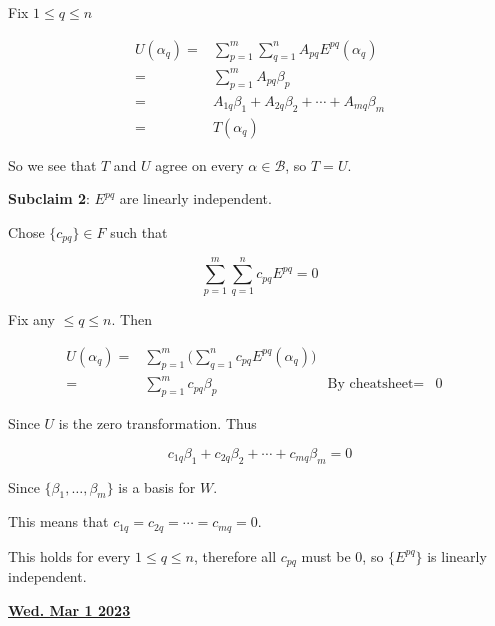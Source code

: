 \documentclass[12pt]{article}
\renewcommand{\date}[1]{\underline{\bf #1}}
\def\B{\mathcal B}
\begin{document}
{    Fix $1 \le q \le n$

    \begin{align*}
      U(\alpha_q) =&\sum_{p = 1}^m \sum_{q = 1}^n A_{pq} E^{pq}(\alpha_q) \\
                  =&\sum_{p = 1}^m  A_{pq} \beta_p \\
                  =&A_{1q} \beta_1 + A_{2q} \beta_2 + \cdots + A_{mq} \beta_m  \\
                  =&T(\alpha_q)
    \end{align*}

    So we see that $T$ and $U$ agree on every $\alpha \in \B$, so $T = U$.


    {\bf Subclaim 2}: $E^{pq}$ are linearly independent.

    Chose $\{c_{pq}\} \in F$ such that

    \[
      \sum_{p = 1}^m \sum_{q = 1}^n c_{pq} E^{pq} = 0
    \]


    Fix any $\le q \le n$. Then

    \begin{align*}
      U(\alpha_q) =&\sum_{p = 1}^{m} \Big( \sum_{q = 1}^{n} c_{pq} E^{pq} (\alpha_q) \Big) & \\
      =&\sum_{p = 1}^{m} c_{pq} \beta_p & \text{By cheatsheet}
      =&0 &
    \end{align*}

    Since $U$ is the zero transformation. Thus

    \[
      c_{1q} \beta_1 + c_{2q} \beta_2 + \cdots + c_{mq} \beta_m = 0
    \]

    Since $\{\beta_1, \dots, \beta_m\}$ is a basis for $W$.

    This means that $c_{1q} = c_{2q} = \cdots = c_{mq} = 0$.

    This holds for every $1 \le q \le n$, therefore all $c_{pq}$ must be $0$, so
    $\{E^{pq}\}$ is linearly independent.
  }


  \date{Wed. Mar 1 2023}

\end{document}
